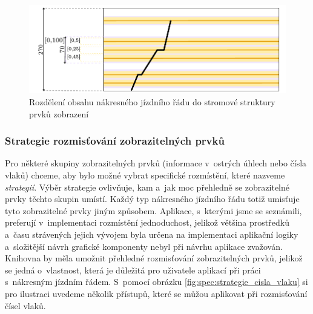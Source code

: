 \begin{figure}[!hbt]
	\includegraphics[width=\textwidth]{../img/kap2_infrastructure_layout}
	\caption{Rozdělení obsahu nákresného jízdního řádu do stromové struktury prvků zobrazení}
	\label{fig:prvky_mereni}
\end{figure}

\subsubsection*{Strategie rozmisťování zobrazitelných prvků}
\label{kap2:strategies_introduction}
Pro některé skupiny zobrazitelných prvků (informace v~ostrých úhlech nebo čísla vlaků) chceme, aby bylo možné vybrat specifické rozmístění, které nazveme \textit{strategií}. Výběr strategie ovlivňuje, kam a~jak moc přehledně se zobrazitelné prvky těchto skupin umístí. Každý typ nákresného jízdního řádu totiž umisťuje tyto zobrazitelné prvky jiným způsobem. Aplikace, s~kterými jsme se seznámili, preferují v~implementaci rozmístění jednoduchost, jelikož většina prostředků a~času strávených jejich vývojem byla určena na implementaci aplikační logiky a~složitější návrh grafické komponenty nebyl při návrhu aplikace zvažován. Knihovna by měla umožnit přehledné rozmisťování zobrazitelných prvků, jelikož se jedná o~vlastnost, která je důležitá pro uživatele aplikací při práci s~nákresným jízdním řádem. S~pomocí obrázku \ref{fig:spec:strategie_cisla_vlaku} si pro ilustraci uvedeme několik přístupů, které se můžou aplikovat při rozmisťování čísel vlaků.

